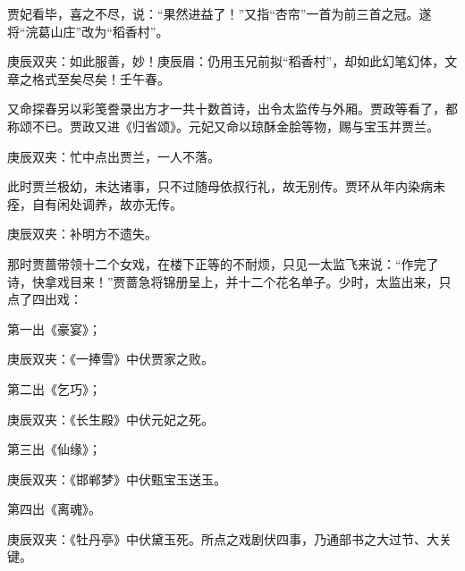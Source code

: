 \begin{parag}
    贾妃看毕，喜之不尽，说：“果然进益了！”又指“杏帘”一首为前三首之冠。遂将“浣葛山庄”改为“稻香村”。\begin{note}庚辰双夹：如此服善，妙！庚辰眉：仍用玉兄前拟“稻香村”，却如此幻笔幻体，文章之格式至矣尽矣！壬午春。\end{note}又命探春另以彩笺誊录出方才一共十数首诗，出令太监传与外厢。贾政等看了，都称颂不已。贾政又进《归省颂》。元妃又命以琼酥金脍等物，赐与宝玉并贾兰。\begin{note}庚辰双夹：忙中点出贾兰，一人不落。\end{note}此时贾兰极幼，未达诸事，只不过随母依叔行礼，故无别传。贾环从年内染病未痊，自有闲处调养，故亦无传。\begin{note}庚辰双夹：补明方不遗失。\end{note}
\end{parag}


\begin{parag}
    那时贾蔷带领十二个女戏，在楼下正等的不耐烦，只见一太监飞来说：“作完了诗，快拿戏目来！”贾蔷急将锦册呈上，并十二个花名单子。少时，太监出来，只点了四出戏：
\end{parag}


\begin{parag}
    第一出《豪宴》；\begin{note}庚辰双夹：《一捧雪》中伏贾家之败。\end{note}
\end{parag}


\begin{parag}
    第二出《乞巧》；\begin{note}庚辰双夹：《长生殿》中伏元妃之死。\end{note}
\end{parag}


\begin{parag}
    第三出《仙缘》；\begin{note}庚辰双夹：《邯郸梦》中伏甄宝玉送玉。\end{note}
\end{parag}


\begin{parag}
    第四出《离魂》。\begin{note}庚辰双夹：《牡丹亭》中伏黛玉死。所点之戏剧伏四事，乃通部书之大过节、大关键。\end{note}
\end{parag}


